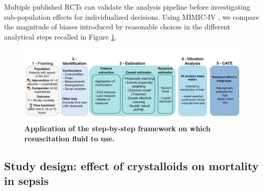 \documentclass[10pt,letterpaper]{article}
\begin{document}
Multiple published RCTs can validate the analysis pipeline before
investigating sub-population effects for individualized decisions. Using
MIMIC-IV \cite{johnson2020mimic}, we compare the magnitude of biases introduced by reasonable
choices in the different analytical steps recalled in Figure \ref{fig:study_summary}.

\begin{figure}[h!]
  \centering
  \includegraphics[width=\linewidth]{img_main/applied_inference_flow.pdf}
  \caption{\textbf{Application of the step-by-step framework on which resuscitation fluid to use.}}\label{fig:study_summary}
\end{figure}


\subsection*{Study design: effect of crystalloids on mortality in sepsis}%
\label{sec:framing_mimic_iv}
\end{document}
